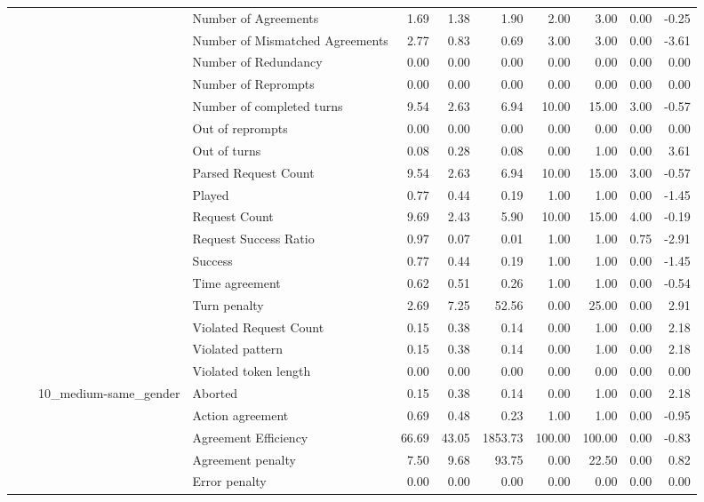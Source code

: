 \begin{tabular}{llllrrrrrrr}
 &  &  & Number of Agreements & 1.69 & 1.38 & 1.90 & 2.00 & 3.00 & 0.00 & -0.25 \\
 &  &  & Number of Mismatched Agreements & 2.77 & 0.83 & 0.69 & 3.00 & 3.00 & 0.00 & -3.61 \\
 &  &  & Number of Redundancy & 0.00 & 0.00 & 0.00 & 0.00 & 0.00 & 0.00 & 0.00 \\
 &  &  & Number of Reprompts & 0.00 & 0.00 & 0.00 & 0.00 & 0.00 & 0.00 & 0.00 \\
 &  &  & Number of completed turns & 9.54 & 2.63 & 6.94 & 10.00 & 15.00 & 3.00 & -0.57 \\
 &  &  & Out of reprompts & 0.00 & 0.00 & 0.00 & 0.00 & 0.00 & 0.00 & 0.00 \\
 &  &  & Out of turns & 0.08 & 0.28 & 0.08 & 0.00 & 1.00 & 0.00 & 3.61 \\
 &  &  & Parsed Request Count & 9.54 & 2.63 & 6.94 & 10.00 & 15.00 & 3.00 & -0.57 \\
 &  &  & Played & 0.77 & 0.44 & 0.19 & 1.00 & 1.00 & 0.00 & -1.45 \\
 &  &  & Request Count & 9.69 & 2.43 & 5.90 & 10.00 & 15.00 & 4.00 & -0.19 \\
 &  &  & Request Success Ratio & 0.97 & 0.07 & 0.01 & 1.00 & 1.00 & 0.75 & -2.91 \\
 &  &  & Success & 0.77 & 0.44 & 0.19 & 1.00 & 1.00 & 0.00 & -1.45 \\
 &  &  & Time agreement & 0.62 & 0.51 & 0.26 & 1.00 & 1.00 & 0.00 & -0.54 \\
 &  &  & Turn penalty & 2.69 & 7.25 & 52.56 & 0.00 & 25.00 & 0.00 & 2.91 \\
 &  &  & Violated Request Count & 0.15 & 0.38 & 0.14 & 0.00 & 1.00 & 0.00 & 2.18 \\
 &  &  & Violated pattern & 0.15 & 0.38 & 0.14 & 0.00 & 1.00 & 0.00 & 2.18 \\
 &  &  & Violated token length & 0.00 & 0.00 & 0.00 & 0.00 & 0.00 & 0.00 & 0.00 \\
\cline{3-11}
 &  & \multirow[t]{27}{*}{10_medium-same_gender} & Aborted & 0.15 & 0.38 & 0.14 & 0.00 & 1.00 & 0.00 & 2.18 \\
 &  &  & Action agreement & 0.69 & 0.48 & 0.23 & 1.00 & 1.00 & 0.00 & -0.95 \\
 &  &  & Agreement Efficiency & 66.69 & 43.05 & 1853.73 & 100.00 & 100.00 & 0.00 & -0.83 \\
 &  &  & Agreement penalty & 7.50 & 9.68 & 93.75 & 0.00 & 22.50 & 0.00 & 0.82 \\
 &  &  & Error penalty & 0.00 & 0.00 & 0.00 & 0.00 & 0.00 & 0.00 & 0.00 \\

\end{tabular}
